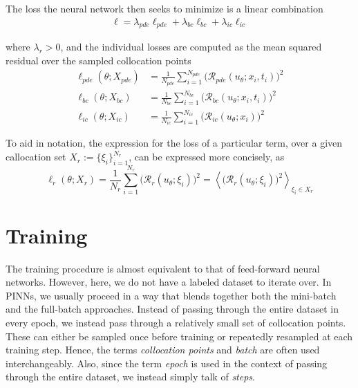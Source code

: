 The loss the neural network then seeks to minimize is a linear combination
\begin{align*}
\ell = \lambda_{pde}\ell_{pde} + \lambda_{bc}\ell_{bc} + \lambda_{ic}\ell_{ic}
\end{align*}

where $\lambda_r>0$, and the individual losses are computed as the mean squared residual over the sampled collocation points
\begin{align*}
\ell_{pde}\left(\theta;X_{pde}\right)
&= \frac{1}{N_{pde}}\sum_{i=1}^{N_{pde}} \big(\mathcal R_{pde}(u_\theta;x_i,t_i)\big)^2\\
\ell_{bc}\left(\theta;X_{bc}\right)
&= \frac{1}{N_{bc}}\sum_{i=1}^{N_{bc}} \big(\mathcal R_{bc}(u_\theta;x_i,t_i)\big)^2\\
\ell_{ic}\left(\theta;X_{ic}\right)
&= \frac{1}{N_{ic}}\sum_{i=1}^{N_{ic}} \big(\mathcal R_{ic}(u_\theta;x_i)\big)^2
\end{align*}

To aid in notation, the expression for the loss of a particular term, over a given callocation set $X_r:=\{\xi_i\}_{i=1}^{N_{r}}$, can be expressed more concisely, as
$$
\ell_{r}\left(\theta;X_r\right)
= \frac{1}{N_r}\sum_{i=1}^{N_{r}} \big(\mathcal R_{r}(u_\theta;\xi_i)\big)^2
= \left\langle\big(\mathcal R_{r}(u_\theta;\xi_i)\big)^2\right\rangle_{\xi_i\in X_r}
$$


\section{Training}


The training procedure is almost equivalent to that of feed-forward neural networks.
However, here, we do not have a labeled dataset to iterate over.
In PINNs, we usually proceed in a way that blends together both the mini-batch and the full-batch approaches.
Instead of passing through the entire dataset in every epoch, we instead pass through a relatively small set of
collocation points. These can either be sampled once before training or repeatedly resampled at each training step.
Hence, the terms \emph{collocation points} and \emph{batch} are often used interchangeably.
Also, since the term \emph{epoch} is used in the context of passing through the entire dataset,
we instead simply talk of \emph{steps}.


